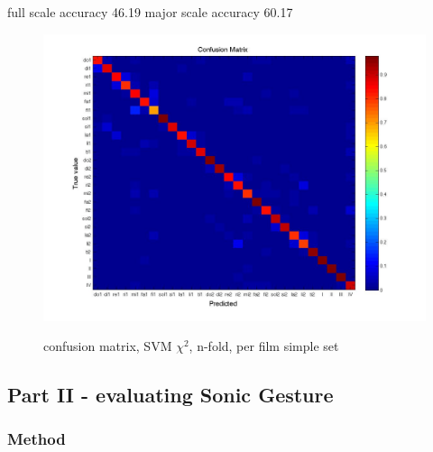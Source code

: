 full scale accuracy 46.19%
major scale accuracy 60.17%


\begin{figure}[htbp]
\begin{center}
\label{fig:confusion}
\includegraphics[width=\linewidth]{confmat/confusion.jpg}
\end{center}
\caption{confusion matrix, SVM $\chi^2$, n-fold, per film simple set}
\end{figure}




\subsection{Part II - evaluating Sonic Gesture}

\subsubsection{Method}

